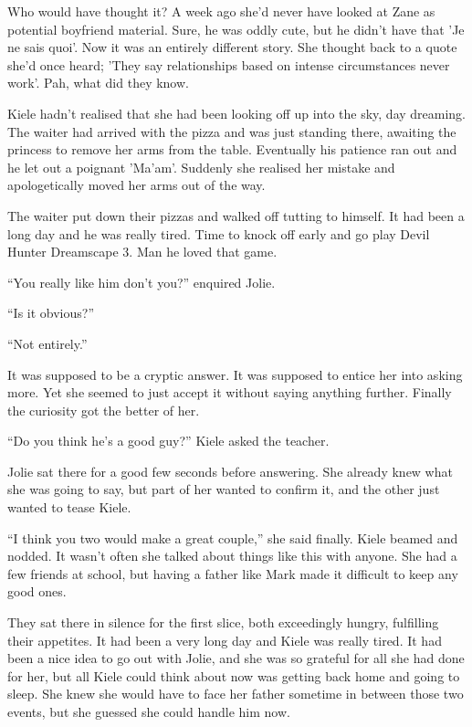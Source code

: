 Who would have thought it?  A week ago she'd never have looked at Zane as potential boyfriend material.  Sure, he was oddly cute, but he didn't have that 'Je ne sais quoi'.  Now it was an entirely different story.  She thought back to a quote she'd once heard;  'They say relationships based on intense circumstances never work'.  Pah, what did they know.

Kiele hadn't realised that she had been looking off up into the sky, day dreaming.  The waiter had arrived with the pizza and was just standing there, awaiting the princess to remove her arms from the table.  Eventually his patience ran out and he let out a poignant 'Ma'am'.  Suddenly she realised her mistake and apologetically moved her arms out of the way.

The waiter put down their pizzas and walked off tutting to himself.  It had been a long day and he was really tired.  Time to knock off early and go play Devil Hunter Dreamscape 3.  Man he loved that game.

``You really like him don't you?'' enquired Jolie.

``Is it obvious?''

``Not entirely.''  

It was supposed to be a cryptic answer.  It was supposed to entice her into asking more.  Yet she seemed to just accept it without saying anything further.  Finally the curiosity got the better of her.

``Do you think he's a good guy?'' Kiele asked the teacher.

Jolie sat there for a good few seconds before answering.  She already knew what she was going to say, but part of her wanted to confirm it, and the other just wanted to tease Kiele.

``I think you two would make a great couple,'' she said finally.  Kiele beamed and nodded.  It wasn't often she talked about things like this with anyone.  She had a few friends at school, but having a father like Mark made it difficult to keep any good ones.  

They sat there in silence for the first slice, both exceedingly hungry, fulfilling their appetites.  It had been a very long day and Kiele was really tired.  It had been a nice idea to go out with Jolie, and she was so grateful for all she had done for her, but all Kiele could think about now was getting back home and going to sleep.  She knew she would have to face her father sometime in between those two events, but she guessed she could handle him now.

